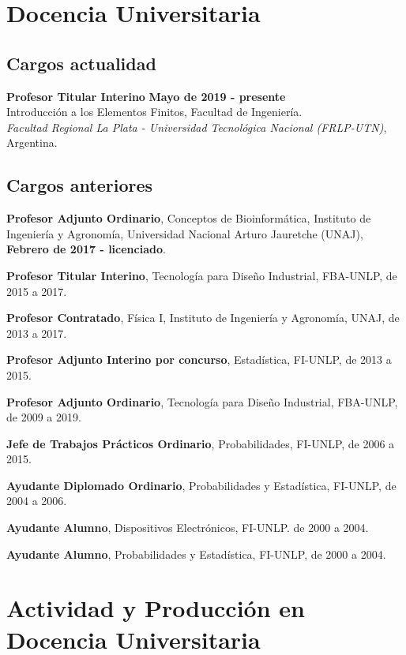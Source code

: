 \documentclass[margin,line]{res}
\begin{document}
\begin{resume}
\section{ Docencia Universitaria}
\vspace*{-.2in}
\subsection{ Cargos actualidad}

{\bf Profesor Titular Interino} \hfill {\bf Mayo de 2019  - presente}\\
Introducción a los Elementos Finitos, Facultad de Ingeniería.\\
{\em Facultad Regional La Plata - Universidad Tecnológica Nacional (FRLP-UTN)}, Argentina.

\vspace*{-.1in}
\subsection{ Cargos anteriores}
\vspace*{-.1in}

{\bf Profesor Adjunto Ordinario}, Conceptos de Bioinformática, Instituto de Ingeniería y Agronomía, Universidad Nacional Arturo Jauretche (UNAJ),  {\bf Febrero de 2017  - licenciado}.

{\bf Profesor Titular Interino}, Tecnología para Diseño Industrial, FBA-UNLP, de 2015 a 2017.

{\bf Profesor Contratado}, Física I, Instituto de Ingeniería y Agronomía, UNAJ, de 2013 a 2017.

{\bf Profesor Adjunto Interino por concurso}, Estadística, FI-UNLP, de 2013 a 2015.

{\bf Profesor Adjunto Ordinario}, Tecnología para Diseño Industrial, FBA-UNLP, de 2009 a 2019.

{\bf Jefe de Trabajos Prácticos Ordinario}, Probabilidades, FI-UNLP, de 2006 a 2015.

{\bf Ayudante Diplomado Ordinario}, Probabilidades y Estadística, FI-UNLP, de 2004 a 2006.

{\bf Ayudante Alumno}, Dispositivos Electrónicos, FI-UNLP. de 2000 a 2004.

{\bf Ayudante Alumno}, Probabilidades y Estadística, FI-UNLP, de 2000 a 2004.

\vspace*{.3in}
\section{ Actividad y Producción en Docencia Universitaria}
\vspace*{-.1in}


\end{resume}
\end{document}
